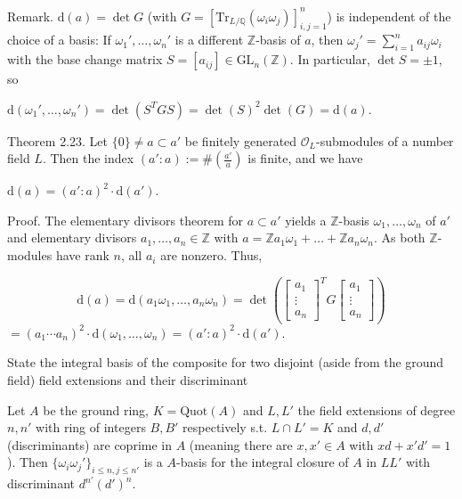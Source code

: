 Remark. 
\(\text{d}(a) = \det G\) (with \(G = [\text{Tr}_{L/\mathbb{Q}}(\omega_i\omega_j)]^n_{i,j=1}\)) 
is independent of the choice of a basis: 
If \(\omega_1', \ldots, \omega_n'\) is a different \(\mathbb{Z}\)-basis of \(a\), then \(\omega_j' = \sum_{i=1}^n a_{ij}\omega_i\) 
with the base change matrix \(S = [a_{ij}] \in \text{GL}_n(\mathbb{Z})\). In particular, \(\det S = \pm 1\), so

\(
\text{d}(\omega_1', \ldots, \omega_n') = \det(S^T G S) = \det(S)^2 \det(G) = \text{d}(a).
\)

Theorem 2.23. 
Let \(\{0\} \neq a \subset a'\) be finitely generated \(\mathcal{O}_L\)-submodules of a number field \(L\). 
Then the index \((a' : a) := \#\left(\frac{a'}{a}\right)\) is finite, and we have

\(
\text{d}(a) = (a' : a)^2 \cdot \text{d}(a').
\)

Proof. 
The elementary divisors theorem for \(a \subset a'\) yields a \(\mathbb{Z}\)-basis \(\omega_1, \ldots, \omega_n\) of \(a'\) and elementary divisors 
\(a_1, \ldots, a_n \in \mathbb{Z}\) with \(a = \mathbb{Z}a_1\omega_1 + \ldots + \mathbb{Z}a_n\omega_n\). 
As both \(\mathbb{Z}\)-modules have rank \(n\), all \(a_i\) are nonzero. Thus,

\[
\text{d}(a) = \text{d}(a_1\omega_1, \ldots, a_n\omega_n) = \det\left(\begin{bmatrix} a_1 \\ \vdots \\ a_n \end{bmatrix}^T G \begin{bmatrix} a_1 \\ \vdots \\ a_n \end{bmatrix}\right)
\]
\(
= (a_1 \cdots a_n)^2 \cdot \text{d}(\omega_1, \ldots, \omega_n) = (a' : a)^2 \cdot \text{d}(a').
\)

State the integral basis of the composite for two disjoint (aside from the ground field) field extensions 
and their discriminant

Let \( A \) be the ground ring, \( K = \text{Quot}(A) \) and \( L, L' \) the field extensions
of degree \( n, n' \) with ring of integers \( B, B' \) respectively s.t. \( L \cap L' = K \) and \( d, d' \) (discriminants)
are coprime in \( A \) (meaning there are \( x, x' \in A\) with \( xd + x'd' = 1 \)).
Then \( \{\omega_i\omega_j'\}_{i\leq n,j\leq n'} \) is a \( A \)-basis for the integral closure of \( A \) in \( LL' \)
with discriminant \( d^{n'}(d')^{n} \).
